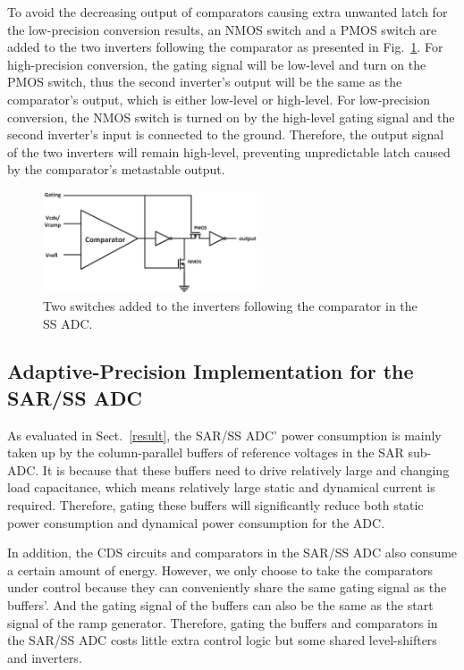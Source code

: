To avoid the decreasing output of comparators causing extra unwanted latch for the low-precision conversion results, an NMOS switch and a PMOS switch are added to the two inverters following the comparator as presented in Fig.~\ref{MATE}. 
For high-precision conversion, the gating signal will be low-level and turn on the PMOS switch, thus the second inverter's output will be the same as the comparator's output, which is either low-level or high-level. 
For low-precision conversion, the NMOS switch is turned on by the high-level gating signal and the second inverter's input is connected to the ground. Therefore, the output signal of the two inverters will remain high-level, preventing unpredictable latch caused by the comparator's metastable output.

\begin{figure}[htbp]
	\centerline{\includegraphics[width=2.5in]{./Figures/MATE.eps}}
	\caption{Two switches added to the inverters following the comparator in the SS ADC.}
	\label{MATE}
\end{figure} 

\subsection{Adaptive-Precision Implementation for the SAR/SS ADC}

As evaluated in Sect.~\ref{result}, the SAR/SS ADC’ power consumption is mainly taken up by the column-parallel buffers of reference voltages in the SAR sub-ADC.
It is because that these buffers need to drive relatively large and changing load capacitance, which means relatively large static and dynamical current is required.
Therefore, gating these buffers will significantly reduce both static power consumption and dynamical power consumption for the ADC.

In addition, the CDS circuits and comparators in the SAR/SS ADC also consume a certain amount of energy. However, we only choose to take the comparators under control because they can conveniently share the same gating signal as the buffers'. And the gating signal of the buffers can also be the same as the start signal of the ramp generator. Therefore, gating the buffers and comparators in the SAR/SS ADC costs little extra control logic but some shared level-shifters and inverters.

